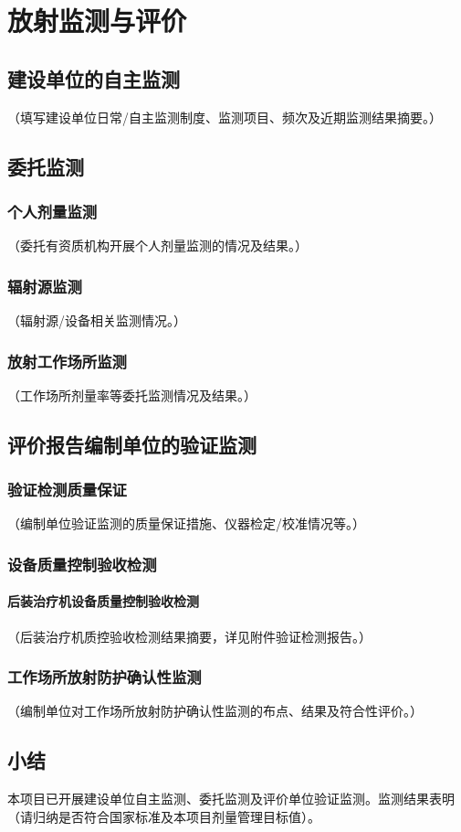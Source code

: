 \chapter{放射监测与评价}

\section{建设单位的自主监测}

（填写建设单位日常/自主监测制度、监测项目、频次及近期监测结果摘要。）

\section{委托监测}

\subsection{个人剂量监测}

（委托有资质机构开展个人剂量监测的情况及结果。）

\subsection{辐射源监测}

（辐射源/设备相关监测情况。）

\subsection{放射工作场所监测}

（工作场所剂量率等委托监测情况及结果。）

\section{评价报告编制单位的验证监测}

\subsection{验证检测质量保证}

（编制单位验证监测的质量保证措施、仪器检定/校准情况等。）

\subsection{设备质量控制验收检测}

\subsubsection{后装治疗机设备质量控制验收检测}

（后装治疗机质控验收检测结果摘要，详见附件验证检测报告。）

\subsection{工作场所放射防护确认性监测}

（编制单位对工作场所放射防护确认性监测的布点、结果及符合性评价。）

\section{小结}

本项目已开展建设单位自主监测、委托监测及评价单位验证监测。监测结果表明（请归纳是否符合国家标准及本项目剂量管理目标值）。
